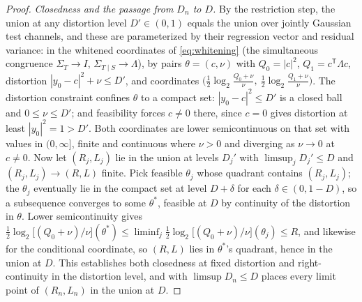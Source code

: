 \documentclass[11pt,onecolumn]{IEEEtran}
\begin{document}
\begin{proof}
\emph{Closedness and the passage from $D_n$ to $D$.} By the restriction
step, the union at any distortion level $D'\in(0,1)$ equals the
union over jointly Gaussian test channels, and these are parameterized
by their regression vector and residual variance: in the whitened
coordinates of \eqref{eq:whitening} (the simultaneous congruence
$\Sigma_T\to I$, $\Sigma_{T\mid S}\to\Lambda$), by pairs
$\theta=(c,\nu)$ with
$Q_0=|c|^2$, $Q_1=c^{\mathsf T}\Lambda c$, distortion
$|y_0-c|^2+\nu\le D'$, and coordinates
$\bigl(\tfrac12\log_2\tfrac{Q_0+\nu}{\nu},\
\tfrac12\log_2\tfrac{Q_1+\nu}{\nu}\bigr)$. The distortion constraint
confines $\theta$ to a compact set: $|y_0-c|^2\le D'$ is a closed ball
and $0\le\nu\le D'$; and feasibility forces $c\ne0$ there, since $c=0$
gives distortion at least $|y_0|^2=1>D'$. Both coordinates are lower
semicontinuous on that set with values in $(0,\infty]$, finite and
continuous where $\nu>0$ and diverging as $\nu\to0$ at $c\ne0$. Now let
$(R_j,L_j)$ lie in the union at levels $D_j'$ with
$\limsup_jD_j'\le D$ and $(R_j,L_j)\to(R,L)$ finite. Pick feasible
$\theta_j$ whose quadrant contains $(R_j,L_j)$; the $\theta_j$
eventually lie in the compact set at level $D+\delta$ for each
$\delta\in(0,1-D)$, so a subsequence converges to some $\theta^*$, feasible at
$D$ by continuity of the distortion in $\theta$. Lower semicontinuity
gives $\tfrac12\log_2\bigl[(Q_0+\nu)/\nu\bigr](\theta^*)\le
\liminf_j\tfrac12\log_2\bigl[(Q_0+\nu)/\nu\bigr](\theta_j)\le R$, and
likewise for the conditional coordinate, so $(R,L)$ lies in
$\theta^*$'s quadrant, hence in the union at $D$. This establishes
both closedness at fixed distortion and right-continuity in the
distortion level, and with $\limsup D_n\le D$ places every limit point
of $(R_n,L_n)$ in the union at $D$.



\end{proof}
\end{document}
